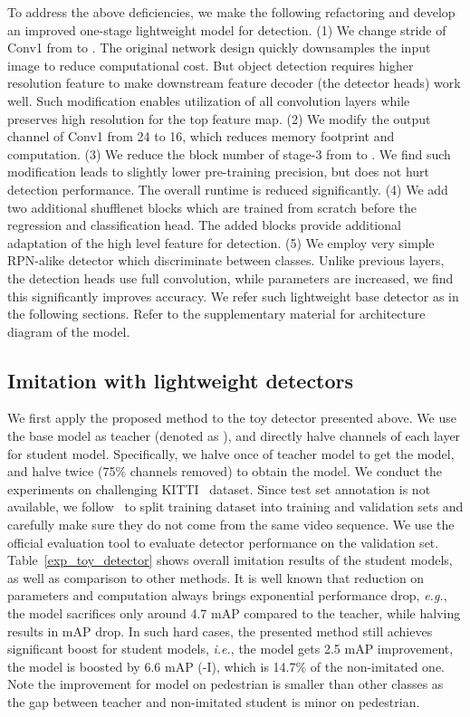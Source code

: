 \documentclass[10pt,twocolumn,letterpaper]{article}
\begin{document}
To address the above deficiencies, we make the following refactoring and develop an improved one-stage lightweight model for detection. (1) We change stride of Conv1 from  to . The original network design quickly downsamples the input image to reduce computational cost. But object detection requires higher resolution feature to make downstream feature decoder (the detector heads) work well. Such modification enables utilization of all convolution layers while preserves high resolution for the top feature map. (2) We modify the output channel of Conv1 from 24 to 16, which reduces memory footprint and computation. (3) We reduce the block number of stage-3 from  to . We find such modification leads to slightly lower pre-training precision, but does not hurt detection performance. The overall runtime is reduced  significantly. (4) We add two additional shufflenet blocks which are trained from scratch before the regression and classification head. The added blocks provide additional adaptation of the high level feature for detection. (5) We employ very simple RPN-alike detector which discriminate between classes. Unlike previous layers, the detection heads use full convolution, while parameters are increased, we find this significantly improves accuracy. We refer such lightweight base detector as  in the following sections. Refer to the supplementary material for architecture diagram of the model.


			

\subsection{Imitation with lightweight detectors}
\label{exp_imitation_toy_detector}
We first apply the proposed method to the toy detector presented above. We use the base model as teacher (denoted as ), and directly halve channels of each layer for student model. Specifically, we halve once of teacher model to get the   model, and halve twice (75\% channels removed) to obtain the  model. We conduct the experiments on challenging KITTI~\cite{Geiger2012CVPR} dataset. Since test set annotation is not available, we follow~\cite{cai2016unified,mao2017can} to split training dataset into training and validation sets and carefully make sure they do not come from the same video sequence. We use the official evaluation tool to evaluate detector performance on the validation set.
Table~\ref{exp_toy_detector} shows overall imitation results of the student models, as well as comparison to other methods. It is well known that reduction on parameters and computation always brings exponential performance drop, \emph{e.g.}, the  model sacrifices only around 4.7 mAP compared to the teacher, while  halving results in  mAP drop. In such hard cases, the presented method still achieves significant boost for student models, \emph{i.e.}, the  model gets 2.5 mAP improvement, the  model is boosted by 6.6 mAP (-I), which is 14.7\% of the non-imitated one. Note the improvement for  model on pedestrian is smaller than other classes as the gap between teacher and non-imitated student is minor on pedestrian.
\end{document}
